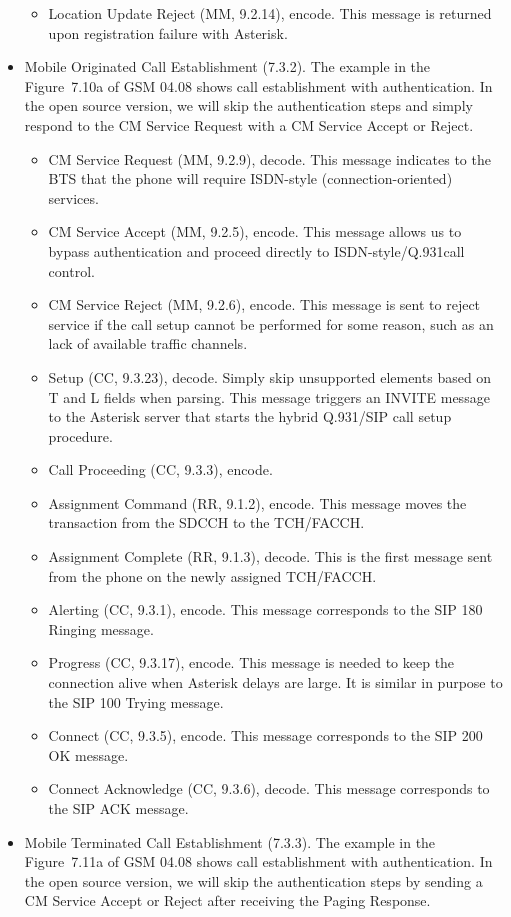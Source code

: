 \documentclass[11pt]{book}
\begin{document}
\begin{itemize}
\begin{itemize}
		\item Location Update Reject (MM, 9.2.14), encode.  This message is returned upon registration failure with Asterisk.
	\end{itemize}
	\item Mobile Originated Call Establishment (7.3.2).  The example in the Figure~7.10a of GSM 04.08 shows call establishment with authentication.  In the open source version, we will skip the authentication steps and simply respond to the CM Service Request with a CM Service Accept or Reject.
	\begin{itemize}
		\item CM Service Request (MM, 9.2.9), decode.  This message indicates to the BTS that the phone will require ISDN-style (connection-oriented) services.
		\item CM Service Accept (MM, 9.2.5), encode.  This message allows us to bypass authentication and proceed directly to ISDN-style/Q.931call control.
		\item CM Service Reject (MM, 9.2.6), encode.  This message is sent to reject service if the call setup cannot be performed for some reason, such as an lack of available traffic channels.
		\item Setup (CC, 9.3.23), decode.  Simply skip unsupported elements based on T and L fields when parsing. This message triggers an INVITE message to the Asterisk server that starts the hybrid Q.931/SIP call setup procedure.
		\item Call Proceeding (CC, 9.3.3), encode.
		\item Assignment Command (RR, 9.1.2), encode.  This message moves the transaction from the SDCCH to the TCH/FACCH.
		\item Assignment Complete (RR, 9.1.3), decode.  This is the first message sent from the phone on the newly assigned TCH/FACCH.
		\item Alerting (CC, 9.3.1), encode.  This message corresponds to the SIP 180 Ringing message.
		\item Progress (CC, 9.3.17), encode.  This message is needed to keep the connection alive when Asterisk delays are large.  It is similar in purpose to the SIP 100 Trying message.
		\item Connect (CC, 9.3.5), encode.  This message corresponds to the SIP 200 OK message.
		\item Connect Acknowledge (CC, 9.3.6), decode.  This message corresponds to the SIP ACK message.
	\end{itemize}
	\item Mobile Terminated Call Establishment (7.3.3).  The example in the Figure~7.11a of GSM 04.08 shows call establishment with authentication.  In the open source version, we will skip the authentication steps by sending a CM Service Accept or Reject after receiving the Paging Response.%

\end{itemize}
\end{document}
